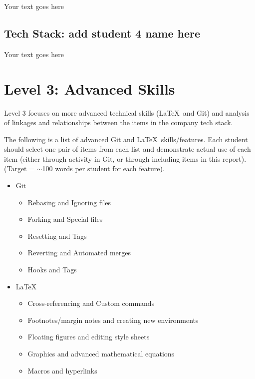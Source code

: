 \documentclass[a4paper, 11pt]{report}
\begin{document}
Your text goes here

\subsection{Tech Stack: add student 4 name here}

Your text goes here



\newpage
\section{Level 3: Advanced Skills}

Level 3 focuses on more advanced technical skills (\LaTeX\ and Git) and analysis of linkages and relationships between the items in the company tech stack.

The following is a list of advanced Git and \LaTeX\ skills/features. Each student should select one pair of items from each list and demonstrate actual use of each item (either through activity in Git, or through including items in this report). (Target = $\sim$100 words per student for each feature).
\begin{itemize}
    \item Git
    \begin{itemize}
        \item Rebasing and Ignoring files
        \item Forking and Special files
        \item Resetting and Tags
        \item Reverting and Automated merges
        \item Hooks and Tags
    \end{itemize}
    \item \LaTeX\ 
    \begin{itemize}
        \item Cross-referencing and Custom commands
        \item Footnotes/margin notes and creating new environments
        \item Floating figures and editing style sheets
        \item Graphics and advanced mathematical equations
        \item Macros and hyperlinks
    \end{itemize}
\end{itemize}
\end{document}

